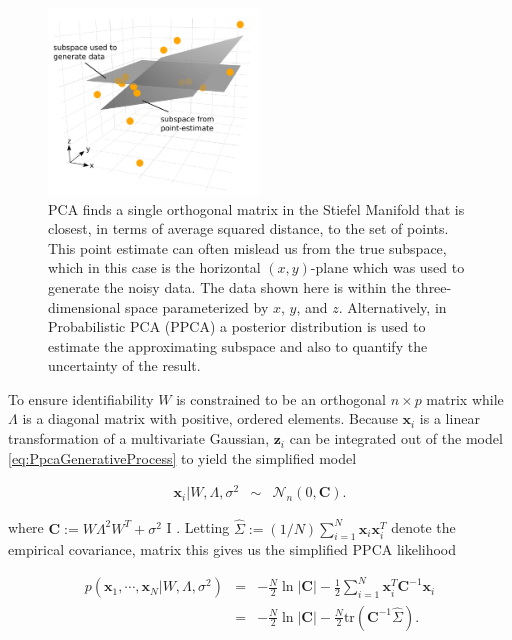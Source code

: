 \documentclass[ba]{imsart}
\newcommand{\mb}[1]{\mathbf{#1}}
\numberwithin{equation}{section}
\theoremstyle{plain}
\begin{document}
\begin{figure}[h]
\centering
\vspace{.1in}
\includegraphics[width=0.5\textwidth]{figures/uncertainty_atz.pdf}
\vspace{.05in}
\caption{PCA finds a single orthogonal matrix in the Stiefel Manifold that is closest, in terms of average squared distance, to the set of points.  This point estimate can often mislead us from the true subspace, which in this case is the horizontal $(x,y)$-plane which was used to generate the noisy data. The data shown here is within the three-dimensional space parameterized by $x$, $y$, and $z$.  Alternatively, in Probabilistic PCA (PPCA) a posterior distribution is used to estimate the approximating subspace and also to quantify the uncertainty of the result.}
\label{fig:MleSubspaceEstimate}
\end{figure}

\noindent To ensure identifiability $W$ is constrained to be an orthogonal $n \times p$ matrix while $\Lambda$ is a diagonal matrix with positive, ordered elements. Because $\mb{x}_i$ is a linear transformation of a multivariate Gaussian, $\mb{z}_i$ can be integrated out of the model \ref{eq:PpcaGenerativeProcess} to yield the simplified model

\begin{eqnarray}
\label{eq:PpcaSimplifiedModel}
\mb{x}_i | W, \Lambda, \sigma^2 &\sim& \mathcal{N}_n(0, \textbf{C}).
\end{eqnarray}

\noindent where $\textbf{C} := W \Lambda^2 W^T + \sigma^2$ I \citep{murphy2012machine}. Letting $\hat{\Sigma} := (1/N) \sum_{i=1}^N \mb{x}_i \mb{x}_i^T$ denote the empirical covariance, matrix this gives us the simplified PPCA likelihood

\begin{eqnarray}
p(\mb{x}_1, \cdots, \mb{x}_N | W, \Lambda, \sigma^2) &=& -\frac{N}{2} \ln |\textbf{C}| - \frac{1}{2} \sum_{i=1}^N \mb{x}_i^T \textbf{C}^{-1} \mb{x}_i\\
&=& -\frac{N}{2} \ln |\textbf{C}| - \frac{N}{2} \mathrm{tr} (\textbf{C}^{-1} \hat{\Sigma}).
\label{eq:ppca_likelihood}
\end{eqnarray}
\end{document}
